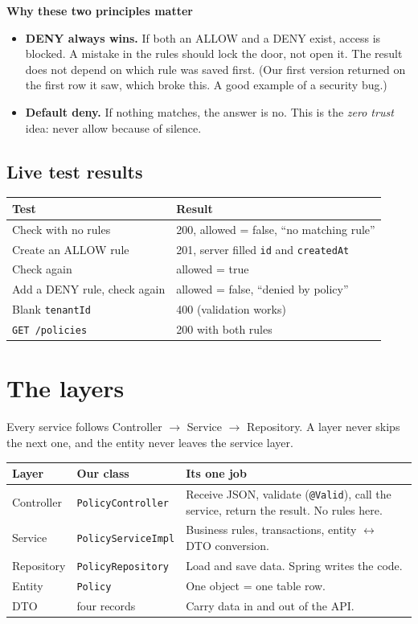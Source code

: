 \documentclass[11pt,a4paper]{article}
\newcommand{\code}[1]{\texttt{\small #1}}
\begin{document}
\textbf{Why these two principles matter}
\begin{itemize}
  \item \textbf{DENY always wins.} If both an ALLOW and a DENY exist, access is blocked. A mistake in the rules should lock the door, not open it. The result does not depend on which rule was saved first. (Our first version returned on the first row it saw, which broke this. A good example of a security bug.)
  \item \textbf{Default deny.} If nothing matches, the answer is no. This is the \emph{zero trust} idea: never allow because of silence.
\end{itemize}

\subsection{Live test results}
\begin{tabular}{@{}p{7.2cm}p{7.8cm}@{}}
\toprule
\textbf{Test} & \textbf{Result} \\
\midrule
Check with no rules & 200, allowed = false, ``no matching rule'' \\
Create an ALLOW rule & 201, server filled \code{id} and \code{createdAt} \\
Check again & allowed = true \\
Add a DENY rule, check again & allowed = false, ``denied by policy'' \\
Blank \code{tenantId} & 400 (validation works) \\
\code{GET /policies} & 200 with both rules \\
\bottomrule
\end{tabular}

\section{The layers}

Every service follows Controller $\rightarrow$ Service $\rightarrow$ Repository. A layer
never skips the next one, and the entity never leaves the service layer.

\begin{tabular}{@{}p{2.6cm}p{3.7cm}p{8.7cm}@{}}
\toprule
\textbf{Layer} & \textbf{Our class} & \textbf{Its one job} \\
\midrule
Controller & \code{PolicyController} & Receive JSON, validate (\code{@Valid}), call the service, return the result. No rules here. \\
Service & \code{PolicyServiceImpl} & Business rules, transactions, entity $\leftrightarrow$ DTO conversion. \\
Repository & \code{PolicyRepository} & Load and save data. Spring writes the code. \\
Entity & \code{Policy} & One object = one table row. \\
DTO & four records & Carry data in and out of the API. \\
\bottomrule
\end{tabular}
\end{document}
